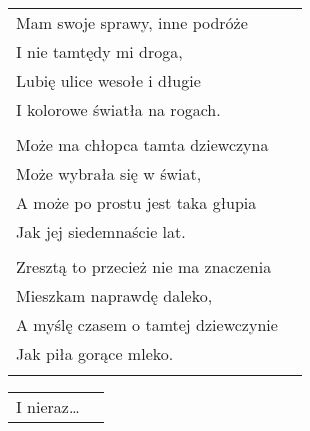 \documentclass[a5paper]{article}
\begin{document}
\noindent
\begin{tabular}{@{}p{8.5cm}p{3cm}@{}}
Mam swoje sprawy, inne podróże\\
I nie tamtędy mi droga,\\
Lubię ulice wesołe i długie\\
I kolorowe światła na rogach.\\\\

Może ma chłopca tamta dziewczyna\\
Może wybrała się w świat,\\
A może po prostu jest taka głupia\\
Jak jej siedemnaście lat.\\\\

Zresztą to przecież nie ma znaczenia\\
Mieszkam naprawdę daleko,\\
A myślę czasem o tamtej dziewczynie\\
Jak piła gorące mleko.\\\\
\end{tabular}

\noindent
\begin{tabular}{@{}p{8.5cm}p{3cm}@{}}
I nieraz…
\end{tabular}
\end{document}
